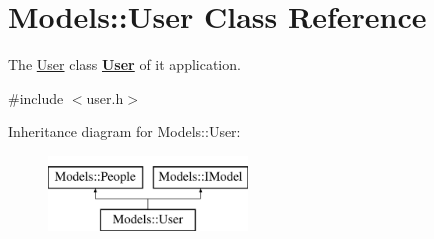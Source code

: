 \hypertarget{classModels_1_1User}{\section{Models\-:\-:User Class Reference}
\label{classModels_1_1User}
}


The \hyperlink{classModels_1_1User}{User} class {\bfseries \hyperlink{classModels_1_1User}{User}} of it application.  




{\ttfamily \#include $<$user.\-h$>$}

Inheritance diagram for Models\-:\-:User\-:\begin{figure}[H]
\begin{center}
\leavevmode
\includegraphics[height=2.000000cm]{df/d68/classModels_1_1User}
\end{center}
\end{figure}
